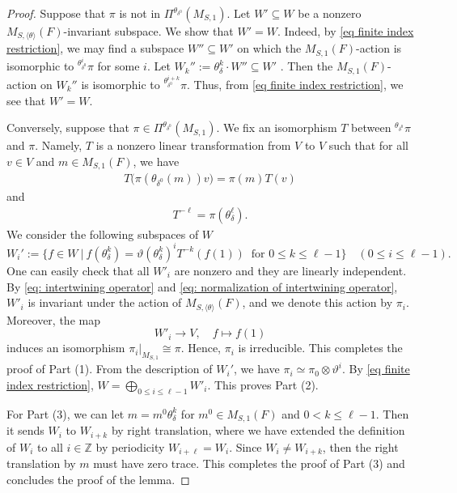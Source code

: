 \documentclass[11pt,letterpaper]{amsart}
\numberwithin{equation}{section}
\begin{document}
\begin{proof}
    Suppose that $\pi $ is not in $ \Pi^{\theta_{\delta^0}}(M_{S,1})$. Let $W' \subseteq W$ be a nonzero $M_{S,\langle \theta \rangle}(F)$-invariant subspace. We show that $W'=W$. Indeed, by \eqref{eq finite index restriction}, we may find a subspace $ W'' \subseteq W'$ on which the $M_{S,1}(F)$-action is isomorphic to ${}^{\theta_{\delta^0}^{i}}\pi$ for some $i$. Let $W_k'':= \theta_{\delta}^k \cdot W'' \subseteq W'$ . Then the $M_{S,1}(F)$-action on $W_k''$ is isomorphic to ${}^{\theta_{\delta^0}^{i+k}}\pi$. Thus, from \eqref{eq finite index restriction}, we see that $W'=W$.

    Conversely, suppose that $\pi \in \Pi^{\theta_{\delta^0}}(M_{S,1})$. We fix an isomorphism $T$ between  ${}^{\theta_{\delta^0}}\pi$ and $\pi$. Namely, $T$ is a nonzero linear transformation from $V$ to $V$ such that for all $v \in V$ and $m \in M_{S,1}(F)$, we have
\begin{align}
\label{eq: intertwining operator}
T\big(\pi(\theta_{\delta^0}(m)) v\big) = \pi(m) T(v)
\end{align}
and
\begin{align}
\label{eq: normalization of intertwining operator}
T^{-\ell} = \pi(\theta_{\delta}^{\ell}).
\end{align}
We consider the following subspaces of $W$
\[
W_i':= \{f \in W\ | \ f(\theta_{\delta}^k)=\vartheta(\theta_{\delta}^k)^i T^{-k}(f(1)) \ \text{ for } 0 \leqslant k \leqslant \ell - 1  \} \quad (0 \leqslant i \leqslant \ell - 1).
\]
One can easily check that all $W'_i$ are nonzero and they are linearly independent. By \eqref{eq: intertwining operator} and \eqref{eq: normalization of intertwining operator}, $W'_i$ is invariant under the action of $M_{S,\langle \theta \rangle}(F)$, and we denote this action by $\pi_i$. Moreover, the map
\[
W'_{i} \rightarrow V, \quad f \mapsto f(1)
\]
induces an isomorphism $\pi_i|_{M_{S,1}} \cong \pi$. Hence, $\pi_i$ is irreducible. This completes the proof of Part (1). From the description of $W_i'$, we have $\pi_{i} \simeq \pi_0 \otimes \vartheta^i$. By \eqref{eq finite index restriction}, $W = \bigoplus_{0 \leqslant i \leqslant \ell - 1} W'_i$. This proves Part (2).

For Part (3), we can let $m = m^0 \theta^k_\delta$ for $m^0 \in M_{S,1}(F)$ and $0 < k \leqslant \ell - 1$. Then it sends $W_i$ to $W_{i+k}$ by right translation, where we have extended the definition of $W_i$ to all $i \in \mathbb{Z}$ by periodicity $W_{i+\ell}=W_i$. Since $W_i \neq W_{i+k}$, then the right translation by $m$ must have zero trace. This completes the proof of Part (3) and concludes the proof of the lemma.
\end{proof}
\end{document}
